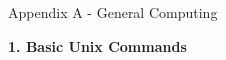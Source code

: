 \documentclass[12pt]{article}
\begin{document}
\newpage


\newpage
\pagestyle{empty}


\newpage
\pagestyle{empty}







\clearpage
\pagestyle{empty}

\vspace{2cm} 

\centerline{\Huge Appendix A - General Computing}

\vspace{2cm}

\begin{center}
{\large{\bf 1. Basic Unix Commands}}
\end{center}
\end{document}
